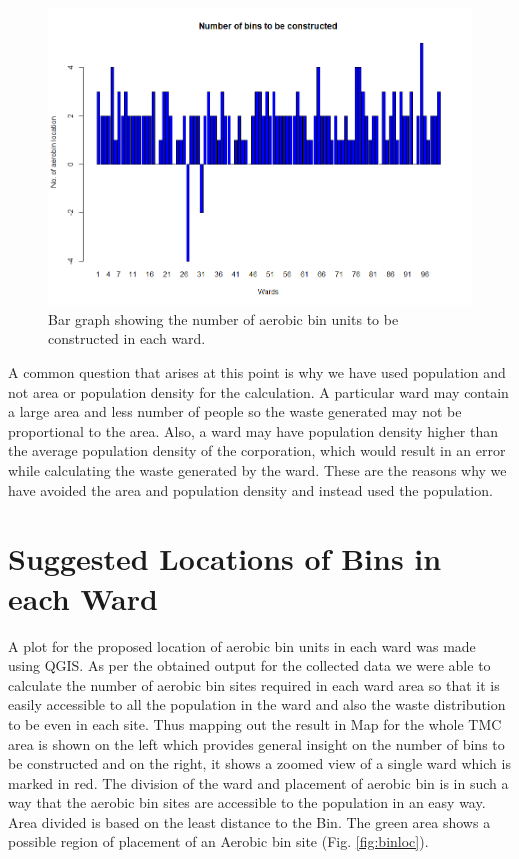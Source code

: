 \documentclass[12pt,a4paper]{report}
\begin{document}
\begin{figure}[H]
	\centering
	\includegraphics[width=0.7\linewidth]{construc}
	\caption{Bar graph showing the number of aerobic bin units to be constructed in each ward.}
	\label{fig:construc}
\end{figure}

A common question that arises at this point is why we have used population and not area or population density for the calculation. A particular ward may contain a large area and less number of people so the waste generated may not be proportional to the area. Also, a ward may have population density higher than the average population density of the corporation, which would result in an error while calculating the waste generated by the ward. These are the reasons why we have avoided the area and population density and instead used the population.

\section{Suggested Locations of Bins in each Ward}
A plot for the proposed location of aerobic bin units in each ward was made using QGIS. As per the obtained output for the collected data we were able to calculate the number of aerobic bin sites required in each ward area so that it is easily accessible to all the population in the ward and also the waste distribution to be even in each site. Thus mapping out the result in Map for the whole TMC area is shown on the left which provides general insight on the number of bins to be constructed and on the right, it shows a zoomed view of a single ward which is marked in red. The division of the ward and placement of aerobic bin is in such a way that the aerobic bin sites are accessible to the population in an easy way. Area divided is based on the least distance to the Bin. The green area shows a possible region of placement of an Aerobic bin site (Fig. \ref{fig:binloc}).
\end{document}
